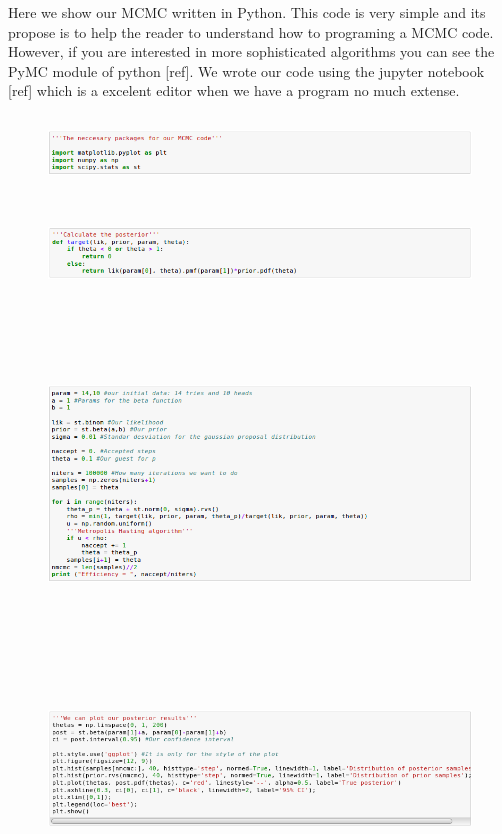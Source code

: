 \documentclass[onecolumn,           %
               showpacs,            %
               preprintnumbers,     %
               aps,                 %
               prl,          	    %
               letterpaper,             %
               superscriptaddress,      %
               nofootinbib,         %
               tightenlines,        %
               floats,floatfix      %
               ,usenatbib,
               ]{revtex4-1}
\begin{document}
Here we show our MCMC written in Python. This code is very simple and its propose is to help the reader to understand how to programing a MCMC code. However, if you are interested in more sophisticated algorithms you can see the PyMC module of python [ref]. We wrote our code using the jupyter notebook [ref] which is a excelent editor when we have a program no much extense.  

\begin{figure}[h!]
\includegraphics[height=2cm]{c1.png}
\end{figure}
\begin{figure}[h!]
\includegraphics[height=2.339cm]{c2.png}
\end{figure}
\begin{figure}[h!]
\includegraphics[height=8.85cm]{c3.png}
\end{figure}
\begin{figure}[h!]
\includegraphics[height=5.21cm]{c4.png}
\end{figure}
\end{document}
